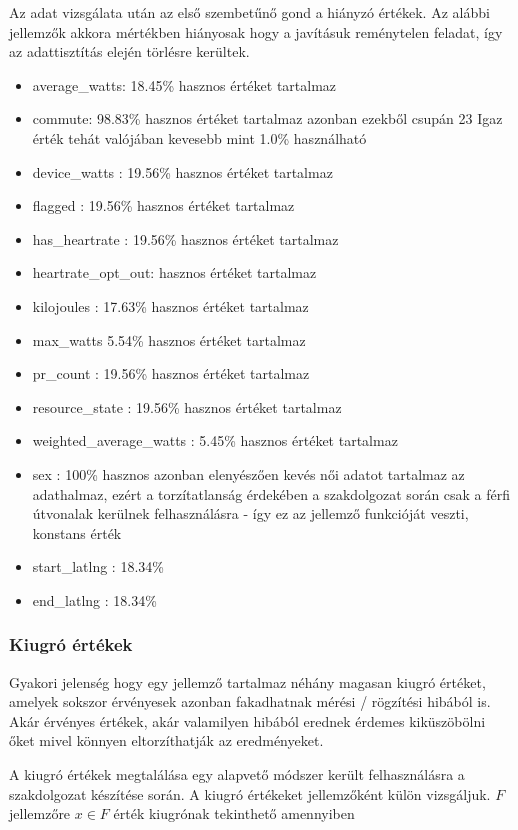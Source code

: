 Az adat vizsgálata után az első szembetűnő gond a hiányzó értékek. Az alábbi jellemzők akkora mértékben hiányosak hogy a javításuk reménytelen feladat, így az adattisztítás elején törlésre kerültek.
\begin{itemize}
	\item average\_watts: 18.45\% hasznos értéket tartalmaz
	\item commute: 98.83\% hasznos értéket tartalmaz azonban ezekből csupán 23 Igaz érték tehát valójában kevesebb mint 1.0\% használható 
	\item device\_watts : 19.56\% hasznos értéket tartalmaz
	\item flagged : 19.56\% hasznos értéket tartalmaz
	\item has\_heartrate : 19.56\% hasznos értéket tartalmaz
	\item heartrate\_opt\_out: \TODO hasznos értéket tartalmaz
	\item kilojoules : 17.63\% hasznos értéket tartalmaz
	\item max\_watts 5.54\% hasznos értéket tartalmaz
	\item pr\_count : 19.56\% hasznos értéket tartalmaz
	\item resource\_state : 19.56\% hasznos értéket tartalmaz
	\item weighted\_average\_watts : 5.45\% hasznos értéket tartalmaz
	\item sex : 100\% hasznos azonban elenyészően kevés női adatot tartalmaz az adathalmaz, ezért a torzítatlanság érdekében a szakdolgozat során csak a férfi útvonalak kerülnek felhasználásra - így ez az jellemző funkcióját veszti, konstans érték
	\item start\_latlng : 18.34\%
	\item end\_latlng : 18.34\%
\end{itemize}


\subsubsection{Kiugró értékek}
Gyakori jelenség hogy egy jellemző tartalmaz néhány magasan kiugró értéket, amelyek sokszor érvényesek azonban fakadhatnak mérési / rögzítési hibából is. Akár érvényes értékek, akár valamilyen hibából erednek érdemes kiküszöbölni őket mivel könnyen eltorzíthatják az eredményeket. 

A kiugró értékek megtalálása egy alapvető módszer került felhasználásra a szakdolgozat készítése során. A kiugró értékeket jellemzőként külön vizsgáljuk. $F$ jellemzőre $x \in F$ érték kiugrónak tekinthető amennyiben

